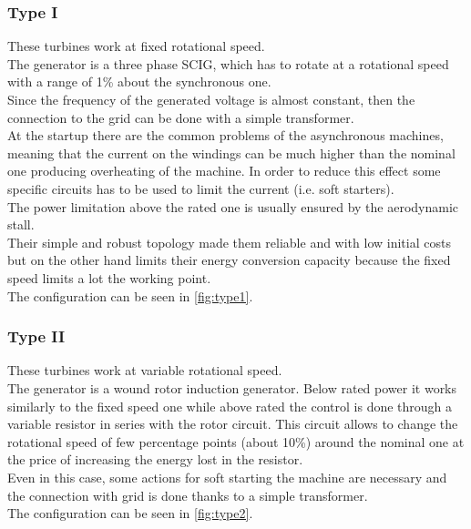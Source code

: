 \subsubsection{Type I}
These turbines work at fixed rotational speed. \\
The generator is a three phase \acrfull{SCIG}, which has to rotate at a rotational speed with a range of 1\% about the synchronous one.\\ 
Since the frequency of the generated voltage is almost constant, then the connection to the grid can be done with a simple transformer. \\
At the startup there are the common problems of the asynchronous machines, meaning that the current on the windings can be much higher than the nominal one producing overheating of the machine. In order to reduce this effect  some specific circuits has to be used to limit the current (i.e. soft starters).\\
The power limitation above the rated one is usually ensured by the aerodynamic stall. \\
Their simple and robust topology made them reliable and with low initial costs but on the other hand limits their energy conversion capacity because the fixed speed limits a lot the working point. \\
The configuration can be seen in \autoref{fig:type1}.

\subsubsection{Type II}
These turbines work at variable rotational speed. \\
The generator is a wound rotor induction generator. Below rated power it works similarly to the fixed speed one while above rated the control is done through a variable resistor in series with the rotor circuit. This circuit allows to change the rotational speed of few percentage points (about 10\%) around the nominal one at the price of increasing the energy lost in the resistor.\\ 
Even in this case, some actions for soft starting the machine are necessary and the connection with grid is done thanks to a simple transformer.\\
The configuration can be seen in \autoref{fig:type2}.

